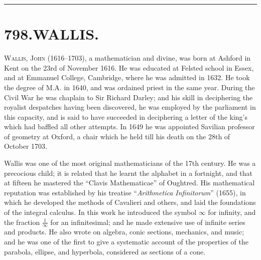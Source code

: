 \documentclass[11pt,a4paper]{article}
\begin{document}
\vspace{1em}
\hrule
\vspace{1em}



\section*{798.\quad WALLIS.}


\smallskip

\textsc{Wallis, John} (1616--1703), a mathematician and divine, was born at Ashford in Kent on the 23rd of November 1616. He was educated at Felsted school in Essex, and at Emmanuel College, Cambridge, where he was admitted in 1632. He took the degree of M.A. in 1640, and was ordained priest in the same year. During the Civil War he was chaplain to Sir Richard Darley; and his skill in deciphering the royalist despatches having been discovered, he was employed by the parliament in this capacity, and is said to have succeeded in deciphering a letter of the king's which had baffled all other attempts. In 1649 he was appointed Savilian professor of geometry at Oxford, a chair which he held till his death on the 28th of October 1703.

Wallis was one of the most original mathematicians of the 17th century. He was a precocious child; it is related that he learnt the alphabet in a fortnight, and that at fifteen he mastered the ``Clavis Mathematicae'' of Oughtred. His mathematical reputation was established by his treatise ``\textit{Arithmetica Infinitorum}'' (1655), in which he developed the methods of Cavalieri and others, and laid the foundations of the integral calculus. In this work he introduced the symbol $\infty$ for infinity, and the fraction $\frac{1}{\infty}$ for an infinitesimal; and he made extensive use of infinite series and products. He also wrote on algebra, conic sections, mechanics, and music; and he was one of the first to give a systematic account of the properties of the parabola, ellipse, and hyperbola, considered as sections of a cone.
\end{document}
